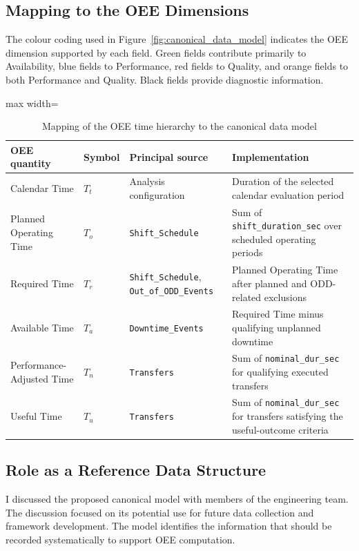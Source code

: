 \subsection{Mapping to the OEE Dimensions}
\label{subsec:mapping-to-the-oee-dimensions}
The colour coding used in Figure~\ref{fig:canonical_data_model} indicates the OEE dimension supported by each field. Green fields contribute primarily to Availability, blue fields to Performance, red fields to Quality, and orange fields to both Performance and Quality. Black fields provide diagnostic information.


\begin{table}[H]
\small
\renewcommand{\arraystretch}{1.3}
\centering
\caption{Mapping of the OEE time hierarchy to the canonical data model}
\label{tab:oee-time-hierarchy-mapping}
\begin{adjustbox}{max width=\textwidth}
\begin{tabular}{|p{3cm}|p{1.4cm}|p{3.5cm}|p{8cm}|}
\hline
\textbf{OEE quantity} & \textbf{Symbol} & \textbf{Principal source} & \textbf{Implementation} \\
\hline
Calendar Time & $T_t$ & Analysis configuration & Duration of the selected calendar evaluation period \\
\hline
Planned Operating Time & $T_o$ & \texttt{Shift\_Schedule} & Sum of \texttt{shift\_duration\_sec} over scheduled operating periods \\
\hline
Required Time & $T_r$ & \texttt{Shift\_Schedule}, \texttt{Out\_of\_ODD\_Events} & Planned Operating Time after planned and ODD-related exclusions \\
\hline
Available Time & $T_a$ & \texttt{Downtime\_Events} & Required Time minus qualifying unplanned downtime \\
\hline
Performance-Adjusted Time & $T_n$ & \texttt{Transfers} & Sum of \texttt{nominal\_dur\_sec} for qualifying executed transfers \\
\hline
Useful Time & $T_u$ & \texttt{Transfers} & Sum of \texttt{nominal\_dur\_sec} for transfers satisfying the useful-outcome criteria \\
\hline
\end{tabular}
\end{adjustbox}
\end{table}

\subsection{Role as a Reference Data Structure}
\label{subsec:role-as-a-reference-data-structure}
I discussed the proposed canonical model with members of the engineering team. The discussion focused on its potential use for future data collection and framework development. The model identifies the information that should be recorded systematically to support OEE computation.


